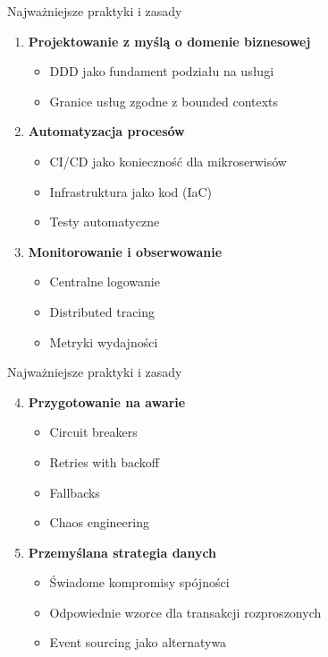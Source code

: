 \documentclass[aspectratio=169,xcolor=table]{beamer}
\begin{document}
\begin{frame}{Najważniejsze praktyki i zasady}
  \begin{enumerate}
    \item \textbf{Projektowanie z myślą o domenie biznesowej}
      \begin{itemize}
        \item DDD jako fundament podziału na usługi
        \item Granice usług zgodne z bounded contexts
      \end{itemize}
      
    \item \textbf{Automatyzacja procesów}
      \begin{itemize}
        \item CI/CD jako konieczność dla mikroserwisów
        \item Infrastruktura jako kod (IaC)
        \item Testy automatyczne
      \end{itemize}
      
    \item \textbf{Monitorowanie i obserwowanie}
      \begin{itemize}
        \item Centralne logowanie
        \item Distributed tracing
        \item Metryki wydajności
      \end{itemize}
  \end{enumerate}
\end{frame}     
\begin{frame}{Najważniejsze praktyki i zasady}
  \begin{enumerate}\setcounter{enumi}{3}
    \item \textbf{Przygotowanie na awarie}
      \begin{itemize}
        \item Circuit breakers
        \item Retries with backoff
        \item Fallbacks
        \item Chaos engineering
      \end{itemize}
      
    \item \textbf{Przemyślana strategia danych}
      \begin{itemize}
        \item Świadome kompromisy spójności
        \item Odpowiednie wzorce dla transakcji rozproszonych
        \item Event sourcing jako alternatywa
      \end{itemize}
  \end{enumerate}
\end{frame}
\end{document}
